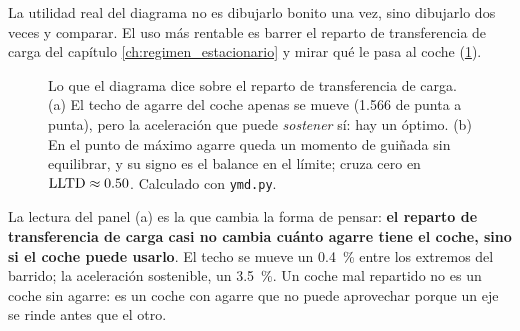 La utilidad real del diagrama no es dibujarlo bonito una vez, sino dibujarlo
dos veces y comparar. El uso más rentable es barrer el reparto de transferencia
de carga del capítulo \ref{ch:regimen_estacionario} y mirar qué le pasa al
coche (\cref{fig:ymd:lltd}).

\begin{figure}[htbp]
\centering
{}%
\hfill
{}
\caption[Efecto del reparto de transferencia de carga]{Lo que el diagrama dice
sobre el reparto de transferencia de carga. (a) El techo de agarre del coche
apenas se mueve (\SI{1.566}{\gacc} de punta a punta), pero la aceleración que
puede \emph{sostener} sí: hay un óptimo. (b) En el punto de máximo agarre queda
un momento de guiñada sin equilibrar, y su signo es el balance en el límite;
cruza cero en $\mathrm{LLTD} \approx \num{0.50}$. Calculado con \texttt{ymd.py}.}
\label{fig:ymd:lltd}
\end{figure}

\begin{clave}
La lectura del panel (a) es la que cambia la forma de pensar: \textbf{el reparto
de transferencia de carga casi no cambia cuánto agarre tiene el coche, sino si
el coche puede usarlo}. El techo se mueve un \SI{0.4}{\percent} entre los
extremos del barrido; la aceleración sostenible, un \SI{3.5}{\percent}. Un coche
mal repartido no es un coche sin agarre: es un coche con agarre que no puede
aprovechar porque un eje se rinde antes que el otro.
\end{clave}


